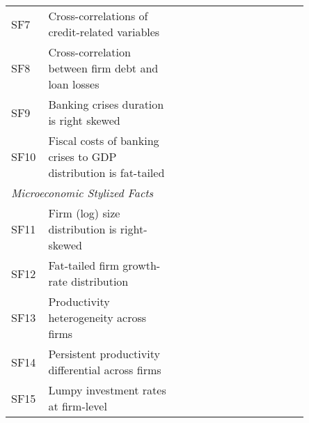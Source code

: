 \begin{table*}[htb]
{\begin{tabular}{p{0.05\linewidth}p{0.4\linewidth}p{0.4\linewidth}}
SF7                                & Cross-correlations of credit-related variables                       & \textcites{lown2006a,leary2009a}                                                                                       \\
SF8                                & Cross-correlation between firm debt and loan losses                  & \textcites{mendoza2014a,foos2010a}                                                                                     \\
SF9                                & Banking crises duration is right skewed                              & \textcites{reinhart2009a}                                                                                              \\
SF10                               & Fiscal costs of banking crises to GDP distribution is fat-tailed     & \textcites{laeven2008a}                                                                                                \\
\multicolumn{3}{l}{\textit{Microeconomic Stylized Facts}}                                                                                                                                                                          \\
SF11                               & Firm (log) size distribution is right-skewed                         & \textcites{dosi2007a}                                                                                                  \\
SF12                               & Fat-tailed firm growth-rate distribution                             & \textcites{bottazzi2003a,bottazzi2006a}                                                                                \\
SF13                               & Productivity heterogeneity across firms                              & \textcites{bartelsman2000a,dosi2007a}                                                                                  \\
SF14                               & Persistent productivity differential across firms                    & \textcites{bartelsman2000a,dosi2007a}                                                                                  \\
SF15                               & Lumpy investment rates at firm-level                                 & \textcites{doms1998a}                                                                                                  \\

\end{tabular}}
\end{table*}
